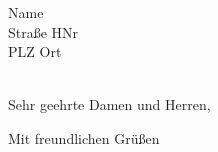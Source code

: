 \documentclass[12pt,a4paper]{dinbrief}
\begin{document}
	\begin{letter}
		{
			Name \\
			Straße HNr \\
			PLZ Ort \\
			~
		}
		\opening{Sehr geehrte Damen und Herren,}
		\closing{Mit freundlichen Grüßen}
	\end{letter}
\end{document}
